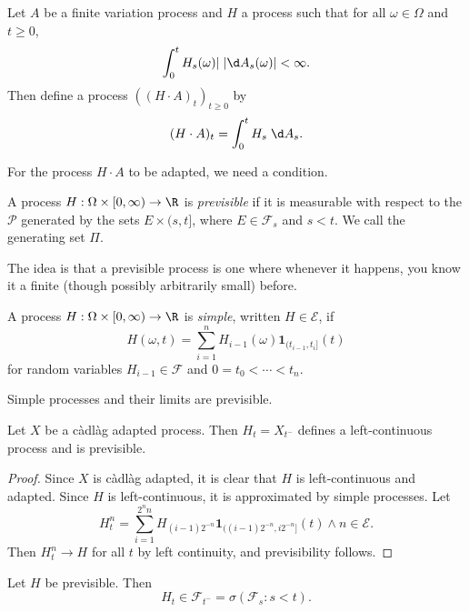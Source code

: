 \documentclass[a4paper]{article}
\begin{document}
\begin{defi}[$(H\cdot A)_t$]
  Let $A$ be a finite variation process and $H$ a process such that for all $\omega \in \Omega$ and $t \geq 0$,
  \[
    \int_0^t H_s(\omega)|\;|\d A_s(\omega)| < \infty.
  \]
  Then define a process $((H \cdot A)_t)_{t \geq 0}$ by
  \[
    (H \cdot A)_t = \int_0^t H_s\;\d A_s.
  \]
\end{defi}
For the process $H \cdot A$ to be adapted, we need a condition.
\begin{defi}
  A process $H: \Omega \times [0, \infty) \to \R$ is \emph{previsible} if it is measurable with respect to the  $\mathcal{P}$ generated by the sets $E \times (s, t]$, where $E \in \mathcal{F}_s$ and $s < t$. We call the generating set $\Pi$.
\end{defi}
The idea is that a previsible process is one where whenever it happens, you know it a finite (though possibly arbitrarily small) before.

\begin{defi}
  A process $H: \Omega \times [0, \infty) \to \R$ is \emph{simple}, written $H \in \mathcal{E}$, if
  \[
    H(\omega, t) = \sum_{i = 1}^n H_{i - 1}(\omega) \mathbf{1}_{(t_{i - 1}, t_i]}(t)
  \]
  for random variables $H_{i - 1} \in \mathcal{F}$ and $0 = t_0 < \cdots < t_n$.
\end{defi}

\begin{fact}
  Simple processes and their limits are previsible.
\end{fact}

\begin{fact}
  Let $X$ be a c\`adl\`ag adapted process. Then $H_t = X_{t^-}$ defines a left-continuous process and is previsible.
\end{fact}

\begin{proof}
  Since $X$ is c\`adl\`ag adapted, it is clear that $H$ is left-continuous and adapted. Since $H$ is left-continuous, it is approximated by simple processes. Let
  \[
    H_t^n = \sum_{i = 1}^{2^nn} H_{(i - 1)2^{-n}} \mathbf{1}_{((i - 1)2^{-n}, i 2^{-n}]} (t) \wedge n \in \mathcal{E}.
  \]
  Then $H_t^n \to H$ for all $t$ by left continuity, and previsibility follows.
\end{proof}

\begin{ex}
  Let $H$ be previsible. Then
  \[
    H_t \in \mathcal{F}_{t^-} = \sigma(\mathcal{F}_s : s < t).
  \]
\end{ex}
\end{document}
